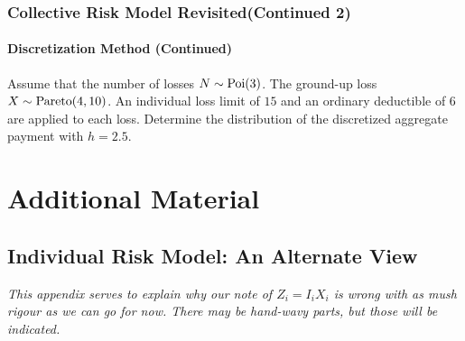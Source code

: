 \documentclass[notoc,notitlepage]{tufte-book}
\begin{document}
\subsection{Collective Risk Model Revisited(Continued 2)}%
\label{sub:collective_risk_model_revisited_continued_2}

\subsubsection{Discretization Method (Continued)}%
\label{ssub:discretization_method_continued}

\begin{eg}
  Assume that the number of losses $N \sim \operatorname{Poi}(3)$. The ground-up loss $X \sim \operatorname{Pareto}(4, 10)$. An individual loss limit of $15$ and an ordinary deductible of $6$ are applied to each loss. Determine the distribution of the discretized aggregate payment with $h = 2.5$.
\end{eg}

\begin{solution}
  
\end{solution}





\appendix

\chapter{Additional Material}%
\label{chp:additional_material}

\section{Individual Risk Model: An Alternate View}%
\label{sec:individual_risk_model_an_alternate_view}

\textit{This appendix serves to explain why our note of $Z_i = I_i X_i$ is wrong with as mush rigour as we can go for now. There may be hand-wavy parts, but those will be indicated.} 
\end{document}

